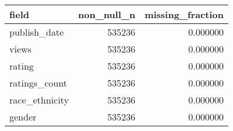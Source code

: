 \begin{tabular}{lrr}
\toprule
field & non_null_n & missing_fraction \\
\midrule
publish_date & 535236 & 0.000000 \\
views & 535236 & 0.000000 \\
rating & 535236 & 0.000000 \\
ratings_count & 535236 & 0.000000 \\
race_ethnicity & 535236 & 0.000000 \\
gender & 535236 & 0.000000 \\
\bottomrule
\end{tabular}
